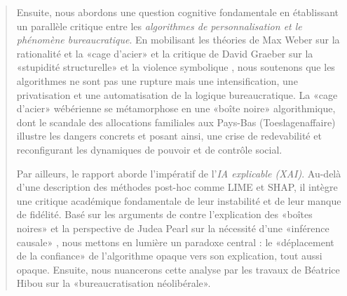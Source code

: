 \begin{quote}
Ensuite, nous abordons une question cognitive fondamentale en établissant un parallèle critique entre les \textit{algorithmes de personnalisation et le phénomène bureaucratique}. En mobilisant les théories de Max Weber sur la rationalité et la «cage d'acier» \citep{Weber1927Wirtschaft, Serpa2019} et la critique de David Graeber sur la «stupidité structurelle» et la violence symbolique \citep{Graeber2015}, nous soutenons que les algorithmes ne sont pas une rupture mais une intensification, une privatisation et une automatisation de la logique bureaucratique. La «cage d'acier» wébérienne se métamorphose en une «boîte noire» algorithmique, dont le scandale des allocations familiales aux Pays-Bas (Toeslagenaffaire) \citep{Heikkilä2023How, AmnestyInternational2021} illustre les dangers concrets et posant ainsi, une crise de redevabilité et reconfigurant les dynamiques de pouvoir et de contrôle social.

Par ailleurs, le rapport aborde l'impératif de l'\textit{IA explicable (XAI)}. Au-delà d'une description des méthodes post-hoc comme LIME et SHAP, il intègre une critique académique fondamentale de leur instabilité et de leur manque de fidélité. Basé sur les arguments de \citet{Rudin2019} contre l'explication des «boîtes noires» et la perspective de Judea Pearl sur la nécessité d'une «inférence causale» \citet{Pearl2005Causality}, nous mettons en lumière un paradoxe central : le «déplacement de la confiance» de l'algorithme opaque vers son explication, tout aussi opaque. Ensuite, nous nuancerons cette analyse par les travaux de Béatrice Hibou sur la «bureaucratisation néolibérale». \citet{Hibou2012La}


\end{quote}

